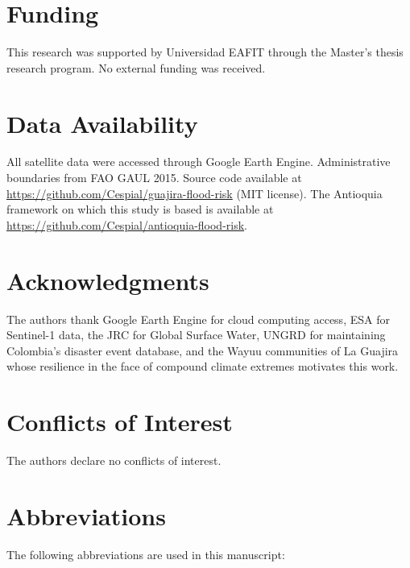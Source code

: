 \documentclass{article}
\begin{document}
\section*{Funding}

This research was supported by Universidad EAFIT through the Master's thesis research program. No external funding was received.

\section*{Data Availability}

All satellite data were accessed through Google Earth Engine. Administrative boundaries from FAO GAUL 2015. Source code available at \url{https://github.com/Cespial/guajira-flood-risk} (MIT license). The Antioquia framework on which this study is based is available at \url{https://github.com/Cespial/antioquia-flood-risk}.

\section*{Acknowledgments}

The authors thank Google Earth Engine for cloud computing access, ESA for Sentinel-1 data, the JRC for Global Surface Water, UNGRD for maintaining Colombia's disaster event database, and the Wayuu communities of La Guajira whose resilience in the face of compound climate extremes motivates this work.

\section*{Conflicts of Interest}

The authors declare no conflicts of interest.

\section*{Abbreviations}

The following abbreviations are used in this manuscript:\\
\end{document}
